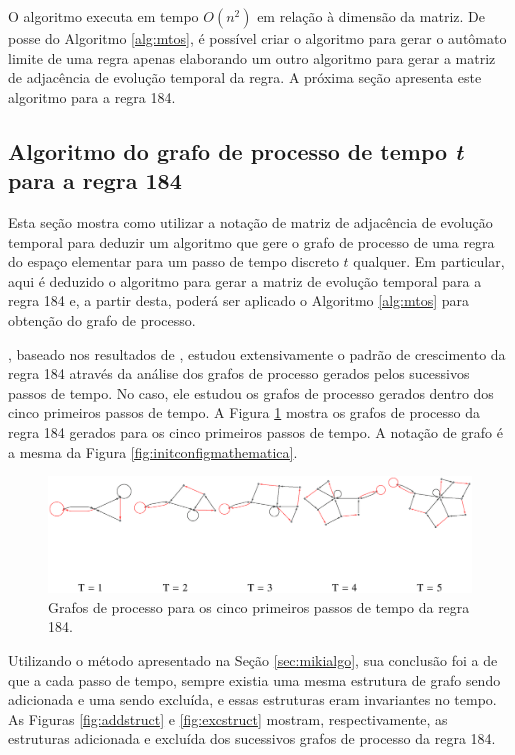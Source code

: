 \documentclass[12pt,a4paper]{article}
\begin{document}
O algoritmo executa em tempo $O(n^2)$ em relação à dimensão da matriz.
De posse do Algoritmo \ref{alg:mtos}, é possível criar o algoritmo para gerar o
autômato limite de uma regra apenas elaborando um outro algoritmo para gerar a
matriz de adjacência de evolução temporal da regra. A próxima seção apresenta este
algoritmo para a regra 184.

\subsection{Algoritmo do grafo de processo de tempo \emph{t} para a regra 184}\label{sec:184}

Esta seção mostra como utilizar a notação de matriz de adjacência
de evolução temporal para deduzir um algoritmo que gere o grafo de processo de uma
regra do espaço elementar para um passo de tempo discreto $t$ qualquer. Em
particular, aqui é deduzido o algoritmo para gerar a matriz de evolução temporal para
a regra 184 e, a partir desta, poderá ser aplicado o Algoritmo \ref{alg:mtos}
para obtenção do grafo de processo.

, baseado nos resultados de ,
estudou extensivamente o padrão de crescimento da regra 184 através da análise
dos grafos de processo gerados pelos sucessivos passos de tempo. No caso, ele estudou
os grafos de processo gerados dentro dos cinco primeiros passos de tempo. A Figura
\ref{fig:184-5t} mostra os grafos de processo da regra 184 gerados para os cinco
primeiros passos de tempo. A notação de grafo é a mesma da Figura
\ref{fig:initconfigmathematica}.

\begin{figure}[htp]
\begin{center}
\includegraphics[scale=0.7]{img/184_5t.eps}
\caption{Grafos de processo para os cinco primeiros passos de tempo da regra 184.}
\label{fig:184-5t}
\end{center}
\end{figure}

Utilizando o método apresentado na Seção \ref{sec:mikialgo}, sua conclusão
foi a de que a cada passo de tempo, sempre existia uma mesma estrutura
de grafo sendo adicionada e uma sendo excluída, e essas estruturas eram
invariantes no tempo. As Figuras \ref{fig:addstruct} e \ref{fig:excstruct}
mostram, respectivamente, as estruturas adicionada e excluída dos sucessivos
grafos de processo da regra 184.
\end{document}
